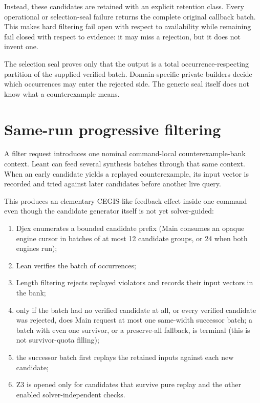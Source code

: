 \documentclass[10pt,letterpaper,oneside]{report}
\begin{document}
Instead, these candidates are retained with an explicit retention class. Every operational or selection-seal failure returns the complete original callback batch. This makes hard filtering fail open with respect to availability while remaining fail closed with respect to evidence: it may miss a rejection, but it does not invent one.

\begin{trustbox}
The selection seal proves only that the output is a total occurrence-respecting partition of the supplied verified batch. Domain-specific private builders decide which occurrences may enter the rejected side. The generic seal itself does not know what a counterexample means.
\end{trustbox}

\section{Same-run progressive filtering}

A filter request introduces one nominal command-local counterexample-bank context. Leant can feed several synthesis batches through that same context. When an early candidate yields a replayed counterexample, its input vector is recorded and tried against later candidates before another live query.

This produces an elementary CEGIS-like feedback effect inside one command even though the candidate generator itself is not yet solver-guided:

\begin{enumerate}
\item Djex enumerates a bounded candidate prefix (Main consumes an opaque engine cursor in batches of at most 12 candidate groups, or 24 when both engines run);
\item Lean verifies the batch of occurrences;
\item Length filtering rejects replayed violators and records their input vectors in the bank;
\item only if the batch had no verified candidate at all, or every verified candidate was rejected, does Main request at most one same-width successor batch; a batch with even one survivor, or a preserve-all fallback, is terminal (this is not survivor-quota filling);
\item the successor batch first replays the retained inputs against each new candidate;
\item Z3 is opened only for candidates that survive pure replay and the other enabled solver-independent checks.
\end{enumerate}
\end{document}
